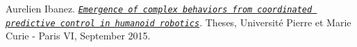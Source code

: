 
\begin{DoxyDescription}
\item[\label{_CITEREF_ibanezThesis2015}%
\mbox{[}1\mbox{]}]Aurelien Ibanez. \href{http://hal.upmc.fr/tel-01308723}{\tt {\itshape Emergence of complex behaviors from coordinated predictive control in humanoid robotics}}. Theses, Universit\'{e} Pierre et Marie Curie -\/ Paris VI, September 2015. 


\end{DoxyDescription}